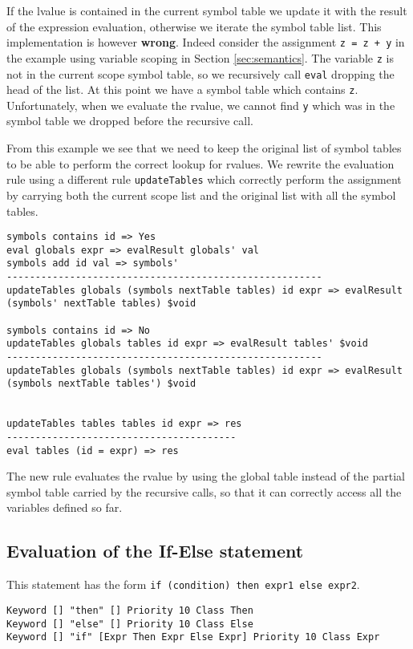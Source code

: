 \noindent
If the lvalue is contained in the current symbol table we update it with the result of the expression evaluation, otherwise we iterate the symbol table list. This implementation is however \textbf{wrong}. Indeed consider the assignment \texttt{z = z + y} in the example using variable scoping in Section \ref{sec:semantics}. The variable \texttt{z} is not in the current scope symbol table, so we recursively call \texttt{eval} dropping the head of the list. At this point we have a symbol table which contains \texttt{z}. Unfortunately, when we evaluate the rvalue, we cannot find \texttt{y} which was in the symbol table we dropped before the recursive call.

From this example we see that we need to keep the original list of symbol tables to be able to perform the correct lookup for rvalues. We rewrite the evaluation rule using a different rule \texttt{updateTables} which correctly perform the assignment by carrying both the current scope list and the original list with all the symbol tables.

\begin{lstlisting}
symbols contains id => Yes
eval globals expr => evalResult globals' val
symbols add id val => symbols'
-------------------------------------------------------
updateTables globals (symbols nextTable tables) id expr => evalResult (symbols' nextTable tables) $void 

symbols contains id => No
updateTables globals tables id expr => evalResult tables' $void
-------------------------------------------------------
updateTables globals (symbols nextTable tables) id expr => evalResult (symbols nextTable tables') $void


updateTables tables tables id expr => res
----------------------------------------
eval tables (id = expr) => res
\end{lstlisting}

\noindent
The new rule evaluates the rvalue by using the global table instead of the partial symbol table carried by the recursive calls, so that it can correctly access all the variables defined so far.

\subsection{Evaluation of the If-Else statement}
This statement has the form \texttt{if (condition) then expr1 else expr2}.

\begin{lstlisting}
Keyword [] "then" [] Priority 10 Class Then
Keyword [] "else" [] Priority 10 Class Else
Keyword [] "if" [Expr Then Expr Else Expr] Priority 10 Class Expr
\end{lstlisting}

